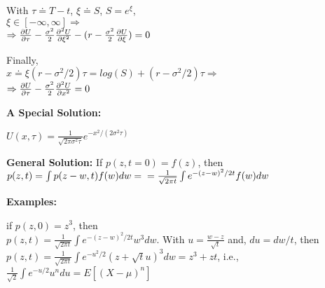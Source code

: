 With $\tau \doteq T -t$, $\xi \doteq S$, $S = e^{\xi}$, \\$\xi \in [-\infty, \infty] \Rightarrow $ \\ $\Rightarrow \frac{\partial U}{\partial \tau} - \frac{\sigma^2}{2}\frac{\partial^{2} U}{\partial \xi^{2}} - (r-\frac{\sigma^2}{2} \frac{\partial U}{\partial \xi}) = 0$ 

Finally, \\$x \doteq \xi (r - \sigma^2/2)\tau = log(S) + (r-\sigma^2/2)\tau \Rightarrow$ \\ $ \Rightarrow \frac{\partial U}{\partial \tau} - \frac{\sigma^2}{2}\frac{\partial^{2} U}{\partial x^{2}} = 0$

\textbf{A Special Solution:}

$U(x, \tau) = \frac{1}{\sqrt{2\pi \sigma^2\tau}} e^{-x^2/(2\sigma^2\tau)}$

\textbf{General Solution:}
If $p(z, t=0) = f(z)$, then
$p(z,t) = \int p(z-w, t)f(w)dw = \\ = \frac{1}{\sqrt{2\pi t}}\int e^{- (z-w)^2/2t}f(w)dw $

\textbf{Examples:}

if $p(z,0) = z^3$, then \\
$p(z,t) = \frac{1}{\sqrt{2\pi t}}\int e^{- (z-w)^2/2t}w^3dw $. With $u = \frac{w-z}{\sqrt{t}} $ and, $du = dw/t$, then $p(z,t) = \frac{1}{\sqrt{2\pi t}}\int e^{- u^2/2}(z + \sqrt{t}u)^3dw = z^3 + zt$, i.e., $\frac{1}{\sqrt{2}}\int e^{-u/2}u^n du = E[(X-\mu)^n]$






